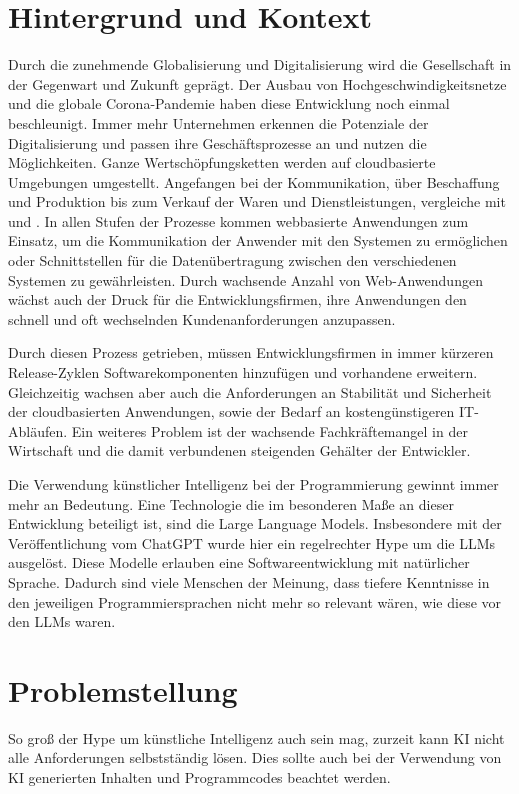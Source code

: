 \section{Hintergrund und Kontext}
Durch die zunehmende Globalisierung und Digitalisierung wird die Gesellschaft in der Gegenwart und Zukunft geprägt. Der Ausbau von Hochgeschwindigkeitsnetze und die globale Corona-Pandemie haben diese Entwicklung noch einmal beschleunigt. Immer mehr Unternehmen erkennen die Potenziale der Digitalisierung und passen ihre Geschäftsprozesse an und nutzen die Möglichkeiten. Ganze Wertschöpfungsketten werden auf cloudbasierte Umgebungen umgestellt. Angefangen bei der Kommunikation, über Beschaffung und Produktion bis zum Verkauf der Waren und Dienstleistungen, vergleiche mit \parencite[Seite 21 ff.]{banholzer-2020} und \cite{oswald-2022}. In allen Stufen der Prozesse kommen webbasierte Anwendungen zum Einsatz, um die Kommunikation der Anwender mit den Systemen zu ermöglichen oder Schnittstellen für die Datenübertragung zwischen den verschiedenen Systemen zu gewährleisten. Durch wachsende Anzahl von Web-Anwendungen wächst auch der Druck für die Entwicklungsfirmen, ihre Anwendungen den schnell und oft wechselnden Kundenanforderungen anzupassen.\vspace{0.2cm}

Durch diesen Prozess getrieben, müssen Entwicklungsfirmen in immer kürzeren Release-Zyklen Softwarekomponenten hinzufügen und vorhandene erweitern. Gleichzeitig wachsen aber auch die Anforderungen an Stabilität und Sicherheit der cloudbasierten Anwendungen, sowie der Bedarf an kostengünstigeren IT-Abläufen. Ein weiteres Problem ist der wachsende Fachkräftemangel in der Wirtschaft und die damit verbundenen steigenden Gehälter der Entwickler.\vspace{0.2cm}

Die Verwendung künstlicher Intelligenz bei der Programmierung gewinnt immer mehr an Bedeutung. Eine Technologie die im besonderen Maße an dieser Entwicklung beteiligt ist, sind die Large Language Models. Insbesondere mit der Veröffentlichung vom ChatGPT wurde hier ein regelrechter Hype um die \acrshort{LLM}s ausgelöst. Diese Modelle erlauben eine Softwareentwicklung mit natürlicher Sprache. Dadurch sind viele Menschen der Meinung, dass tiefere Kenntnisse in den jeweiligen Programmiersprachen nicht mehr so relevant wären, wie diese vor den LLMs waren.\vspace{0.2cm}


\section{Problemstellung}
So groß der Hype um künstliche Intelligenz auch sein mag, zurzeit kann KI nicht alle Anforderungen selbstständig lösen. Dies sollte auch bei der Verwendung von KI generierten Inhalten und Programmcodes beachtet werden.

